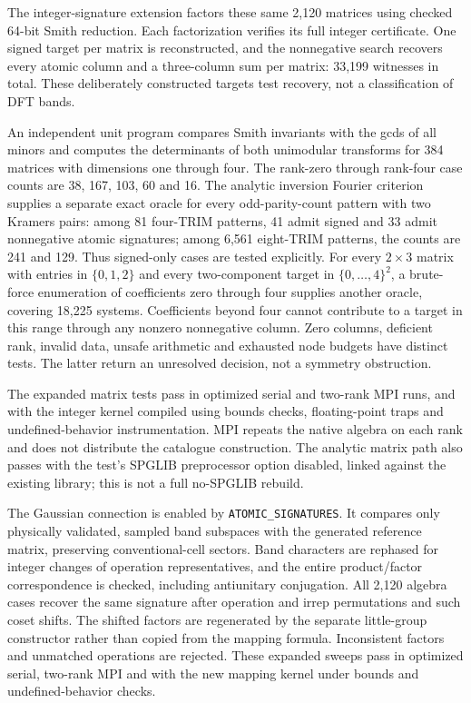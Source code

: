 \documentclass[11pt]{article}
\begin{document}
The integer-signature extension factors these same 2,120 matrices
using checked 64-bit Smith reduction. Each factorization verifies its
full integer certificate. One signed target per matrix is reconstructed,
and the nonnegative search recovers every atomic column and a
three-column sum per matrix: 33,199 witnesses in total. These deliberately
constructed targets test recovery, not a classification of DFT bands.

An independent unit program compares Smith invariants with the gcds
of all minors and computes the determinants of both unimodular
transforms for 384 matrices with dimensions one through four.
The rank-zero through rank-four case counts are 38, 167, 103, 60 and 16.
The analytic inversion Fourier criterion supplies a separate exact
oracle for every odd-parity-count pattern with two Kramers pairs:
among 81 four-TRIM patterns, 41 admit signed and 33 admit nonnegative
atomic signatures; among 6,561 eight-TRIM patterns, the counts are
241 and 129. Thus signed-only cases are tested explicitly.
For every $2\times3$ matrix with entries in $\{0,1,2\}$ and every
two-component target in $\{0,\ldots,4\}^2$, a brute-force enumeration
of coefficients zero through four supplies another oracle, covering
18,225 systems. Coefficients beyond four cannot contribute to a
target in this range through any nonzero nonnegative column.
Zero columns, deficient rank, invalid data, unsafe arithmetic and
exhausted node budgets have distinct tests. The latter return an
unresolved decision, not a symmetry obstruction.

The expanded matrix tests pass in optimized serial and two-rank MPI
runs, and with the integer kernel compiled using bounds checks,
floating-point traps and undefined-behavior instrumentation.
MPI repeats the native algebra on each rank and does not
distribute the catalogue construction. The analytic matrix path also
passes with the test's SPGLIB preprocessor option disabled, linked
against the existing library; this is not a full no-SPGLIB rebuild.

The Gaussian connection is enabled by \texttt{ATOMIC\_SIGNATURES}.
It compares only physically validated, sampled band subspaces with
the generated reference matrix, preserving conventional-cell sectors.
Band characters are rephased for integer changes of operation
representatives, and the entire product/factor correspondence is
checked, including antiunitary conjugation. All 2,120 algebra cases
recover the same signature after operation and irrep permutations
and such coset shifts. The shifted factors are regenerated by the
separate little-group constructor rather than copied from the mapping
formula. Inconsistent factors and unmatched operations are rejected.
These expanded sweeps pass in optimized serial, two-rank MPI and
with the new mapping kernel under bounds and undefined-behavior checks.
\end{document}
